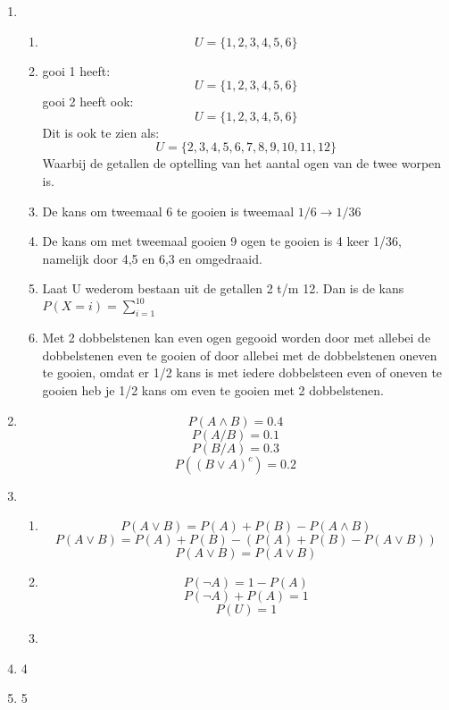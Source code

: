 \documentclass[pdftex,12pt,a4paper]{article}
\begin{document}

\begin{enumerate}
    \item
        \begin{enumerate}
            \item
            	$$U=\{1,2,3,4,5,6\}$$
            \item
            	gooi 1 heeft:
            		$$U=\{1,2,3,4,5,6\}$$
            	gooi 2 heeft ook:
            		$$U=\{1,2,3,4,5,6\}$$
            	Dit is ook te zien als:
            		$$U=\{2,3,4,5,6,7,8,9,10,11,12\}$$
            	Waarbij de getallen de optelling van het aantal ogen van de twee worpen is.
            \item
            	De kans om tweemaal 6 te gooien is tweemaal $1/6 \rightarrow 1/36$
            \item
            	De kans om met tweemaal gooien 9 ogen te gooien is 4 keer 1/36, namelijk door 4,5 en 6,3 en omgedraaid.
            \item
            	Laat U wederom bestaan uit de getallen 2 t/m 12.
            	Dan is de kans $P(X=i) = \sum_{i=1}^{10}$
            \item
            	Met 2 dobbelstenen kan even ogen gegooid worden door met allebei de dobbelstenen even te gooien of door allebei met de dobbelstenen oneven te gooien, omdat er 1/2 kans is met iedere dobbelsteen even of oneven te gooien heb je 1/2 kans om even te gooien met 2 dobbelstenen.
        \end{enumerate}

    \item
    	$$P(A \wedge B) = 0.4$$
    	$$P(A/B) = 0.1$$
    	$$P(B/A) = 0.3$$
    	$$P((B \vee A)^c) = 0.2$$

	\item
    	\begin{enumerate}
    		\item
    			$$P(A \vee B) = P(A) + P(B) - P(A \wedge B)$$
    			$$P(A \vee B) = P(A) + P(B) - (P(A) + P(B) - P(A \vee B))$$
    			$$P(A \vee B) = P(A \vee B)$$
    		\item
    			$$P(\neg A) = 1 - P(A)$$
    			$$P(\neg A) + P(A) = 1$$
    			$$P(U) = 1$$

    		\item

    	\end{enumerate}
    \item
    	4
    \item 
    	5
\end{enumerate}
\end{document}
